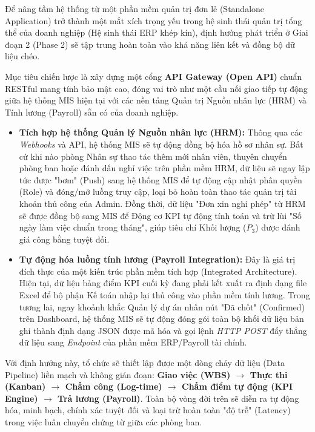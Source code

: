 \documentclass[a4paper,13.5pt]{extreport}
\begin{document}
Để nâng tầm hệ thống từ một phần mềm quản trị đơn lẻ (Standalone Application) trở thành một mắt xích trọng yếu trong hệ sinh thái quản trị tổng thể của doanh nghiệp (Hệ sinh thái ERP khép kín), định hướng phát triển ở Giai đoạn 2 (Phase 2) sẽ tập trung hoàn toàn vào khả năng liên kết và đồng bộ dữ liệu chéo.

Mục tiêu chiến lược là xây dựng một cổng \textbf{API Gateway (Open API)} chuẩn RESTful mang tính bảo mật cao, đóng vai trò như một cầu nối giao tiếp tự động giữa hệ thống MIS hiện tại với các nền tảng Quản trị Nguồn nhân lực (HRM) và Tính lương (Payroll) sẵn có của doanh nghiệp.

\begin{itemize}
    \item \textbf{Tích hợp hệ thống Quản lý Nguồn nhân lực (HRM):} Thông qua các \textit{Webhooks} và API, hệ thống MIS sẽ tự động đồng bộ hóa hồ sơ nhân sự. Bất cứ khi nào phòng Nhân sự thao tác thêm mới nhân viên, thuyên chuyển phòng ban hoặc đánh dấu nghỉ việc trên phần mềm HRM, dữ liệu sẽ ngay lập tức được "bơm" (Push) sang hệ thống MIS để tự động cập nhật phân quyền (Role) và đóng/mở luồng truy cập, loại bỏ hoàn toàn thao tác quản trị tài khoản thủ công của Admin. Đồng thời, dữ liệu "Đơn xin nghỉ phép" từ HRM sẽ được đồng bộ sang MIS để Động cơ KPI tự động tính toán và trừ lùi "Số ngày làm việc chuẩn trong tháng", giúp tiêu chí Khối lượng ($P_3$) được đánh giá công bằng tuyệt đối.
    \item \textbf{Tự động hóa luồng tính lương (Payroll Integration):} Đây là giá trị đích thực của một kiến trúc phần mềm tích hợp (Integrated Architecture). Hiện tại, dữ liệu bảng điểm KPI cuối kỳ đang phải kết xuất ra định dạng file Excel để bộ phận Kế toán nhập lại thủ công vào phần mềm tính lương. Trong tương lai, ngay khoảnh khắc Quản lý dự án nhấn nút "Đã chốt" (Confirmed) trên Dashboard, hệ thống MIS sẽ tự động đóng gói toàn bộ khối dữ liệu bản ghi thành định dạng JSON được mã hóa và gọi lệnh \textit{HTTP POST} đẩy thẳng dữ liệu sang \textit{Endpoint} của phần mềm ERP/Payroll tài chính.
\end{itemize}

Với định hướng này, tổ chức sẽ thiết lập được một dòng chảy dữ liệu (Data Pipeline) liền mạch và không gián đoạn: \textbf{Giao việc (WBS) $\rightarrow$ Thực thi (Kanban) $\rightarrow$ Chấm công (Log-time) $\rightarrow$ Chấm điểm tự động (KPI Engine) $\rightarrow$ Trả lương (Payroll)}. Toàn bộ vòng đời trên sẽ diễn ra tự động hóa, minh bạch, chính xác tuyệt đối và loại trừ hoàn toàn "độ trễ" (Latency) trong việc luân chuyển chứng từ giữa các phòng ban.
\end{document}
